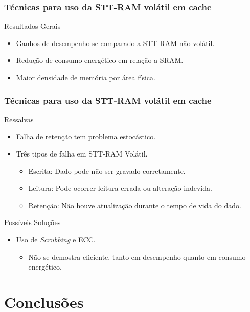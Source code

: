 \documentclass[10pt, pdf,xcolor=pdftex,dvipsnames,table]{beamer}
\begin{document}
\frame
{
\frametitle{Técnicas para uso da STT-RAM volátil em cache}
		\begin{block}{Resultados Gerais}
			\begin{itemize}
				\item Ganhos de desempenho se comparado a STT-RAM não volátil.
				\item Redução de consumo energético em relação a SRAM.
				\item Maior densidade de memória por área física.
			\end{itemize}	 
		\end{block}
}

\frame
{
\frametitle{Técnicas para uso da STT-RAM volátil em cache}
		\begin{block}{Ressalvas}
			\begin{itemize}
				\item Falha de retenção tem problema estocástico.
				\item Três tipos de falha em STT-RAM Volátil.
				\begin{itemize}
					\item Escrita: Dado pode não ser gravado corretamente.
					\item Leitura: Pode ocorrer leitura errada ou alteração indevida.
					\item Retenção: Não houve atualização durante o tempo de vida do dado.
				\end{itemize} 
			\end{itemize}	 
		\end{block}
		\begin{block}{Possíveis Soluções}
			\begin{itemize}
				\item Uso de \textit{Scrubbing} e ECC.
				\begin{itemize}
					\item Não se demostra eficiente, tanto em desempenho quanto em consumo energético.
				\end{itemize} 
			\end{itemize}	 
		\end{block}
}

\section{Conclusões}
\end{document}
